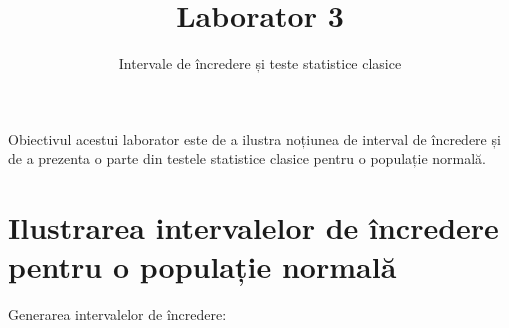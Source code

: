 \documentclass[]{article}
\title{Laborator 3}
\subtitle{Intervale de încredere și teste statistice clasice}
\author{}
\date{}
\begin{document}
\maketitle

\thispagestyle{fancy}

Obiectivul acestui laborator este de a ilustra noțiunea de interval de
încredere și de a prezenta o parte din testele statistice clasice pentru
o populație normală.

\section{Ilustrarea intervalelor de încredere pentru o populație
normală}\label{ilustrarea-intervalelor-de-incredere-pentru-o-populatie-normala}

Generarea intervalelor de încredere:
\end{document}
